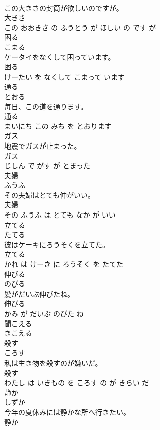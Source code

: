 \documentclass[8pt]{extreport}
\begin{document}
\begin{CJK}{UTF8}{min}
\\	この大きさの封筒が欲しいのですが。	
\\	大きさ 
\\	この おおきさ の ふうとう が ほしい の です が			
\\	困る	
\\	こまる			
\\	ケータイをなくして困っています。	
\\	困る 
\\	けーたい を なくして こまって います			
\\	通る	
\\	とおる			
\\	毎日、この道を通ります。	
\\	通る 
\\	まいにち この みち を とおります			
\\	ガス	
\\	地震でガスが止まった。	
\\	ガス 
\\	じしん で がす が とまった			
\\	夫婦	
\\	ふうふ			
\\	その夫婦はとても仲がいい。	
\\	夫婦 
\\	その ふうふ は とても なか が いい			
\\	立てる	
\\	たてる			
\\	彼はケーキにろうそくを立てた。	
\\	立てる 
\\	かれ は けーき に ろうそく を たてた			
\\	伸びる	
\\	のびる			
\\	髪がだいぶ伸びたね。	
\\	伸びる 
\\	かみ が だいぶ のびた ね			
\\	聞こえる	
\\	きこえる			
\\	殺す	
\\	ころす			
\\	私は生き物を殺すのが嫌いだ。	
\\	殺す 
\\	わたし は いきもの を ころす の が きらい だ			
\\	静か	
\\	しずか			
\\	今年の夏休みには静かな所へ行きたい。	
\\	静か 

\end{CJK}
\end{document}
